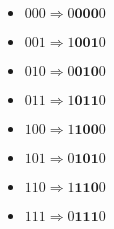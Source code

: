 \begin{aufgabe}
\begin{enumerate}[label=\alph*)]
    \begin{multicols}{3}
        \begin{itemize}[label=]\narrowitems
            \item \(000 \Rightarrow 0\mathbf{000}0\)
            \item \(001 \Rightarrow 1\mathbf{001}0\)
            \item \(010 \Rightarrow 0\mathbf{010}0\)
            \item \(011 \Rightarrow 1\mathbf{011}0\)
            \item \(100 \Rightarrow 1\mathbf{100}0\)
            \item \(101 \Rightarrow 0\mathbf{101}0\)
            \item \(110 \Rightarrow 1\mathbf{110}0\)
            \item \(111 \Rightarrow 0\mathbf{111}0\)
        \end{itemize}
    \end{multicols}
\end{enumerate}
\end{aufgabe}\newpage
